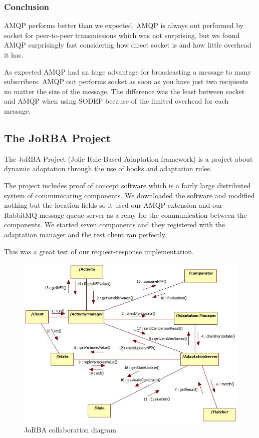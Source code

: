 \subsubsection{Conclusion}
AMQP performs better than we expected. AMQP is always out performed by socket for peer-to-peer transmissions which was not surprising, but we found AMQP surprisingly fast considering how direct socket is and how little overhead it has.

As expected AMQP had an huge advantage for broadcasting a message to many subscribers. AMQP out performs socket as soon as you have just two recipients no matter the size of the message. The difference was the least between socket and AMQP when using SODEP because of the limited overhead for each message.
\subsection{The JoRBA Project}
\label{subsec:The JoRBA Project}
The JoRBA Project\cite{Jorba} (Jolie Rule-Based Adaptation framework) is a project about dynamic adaptation through the use of hooks and adaptation rules.

The project includes proof of concept software which is a fairly large distributed system of communicating components. We downloaded the software and modified nothing but the location fields so it used our AMQP extension and our RabbitMQ message queue server as a relay for the communication between the components. We started seven components and they registered with the adaptation manager and the test client ran perfectly.

This was a great test of our request-response implementation.
\begin{figure}[H]
  \includegraphics[width=\textwidth]{illustrations/Jorba.png}
  \caption{JoRBA collaboration diagram}
\end{figure}
\newpage
